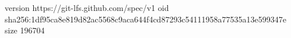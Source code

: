 version https://git-lfs.github.com/spec/v1
oid sha256:1df95ca8e819d82ac5568c9aca644f4cd87293c54111958a77535a13e599347e
size 196704
